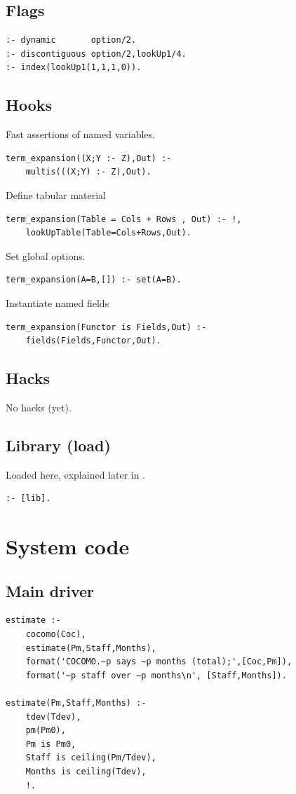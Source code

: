 \documentclass[twocolumn,global]{svjour}
\begin{document}
\subsection{ Flags }\begin{Verbatim}
:- dynamic       option/2.
:- discontiguous option/2,lookUp1/4.
:- index(lookUp1(1,1,1,0)).
\end{Verbatim}
\subsection{ Hooks
}
 Fast assertions of named variables.
\begin{Verbatim}
term_expansion((X;Y :- Z),Out) :-
    multis(((X;Y) :- Z),Out).
\end{Verbatim}
 Define tabular material
\begin{Verbatim}
term_expansion(Table = Cols + Rows , Out) :- !,
    lookUpTable(Table=Cols+Rows,Out).
\end{Verbatim}
 Set global options.
\begin{Verbatim}
term_expansion(A=B,[]) :- set(A=B).
\end{Verbatim}
 Instantiate named fields
\begin{Verbatim}
term_expansion(Functor is Fields,Out) :-
    fields(Fields,Functor,Out).
\end{Verbatim}
\subsection{ Hacks
}
 No hacks (yet).
\subsection{ Library (load)
}
 Loaded here, explained later in .
\begin{Verbatim}
:- [lib].
\end{Verbatim}
\section{ System code
}
\subsection{ Main driver }\begin{Verbatim}
estimate :-
    cocomo(Coc),
    estimate(Pm,Staff,Months),
    format('COCOMO.~p says ~p months (total);',[Coc,Pm]),
    format('~p staff over ~p months\n', [Staff,Months]).

estimate(Pm,Staff,Months) :-
    tdev(Tdev),
    pm(Pm0),
    Pm is Pm0,
    Staff is ceiling(Pm/Tdev),
    Months is ceiling(Tdev),
    !.
\end{Verbatim}
\end{document}
